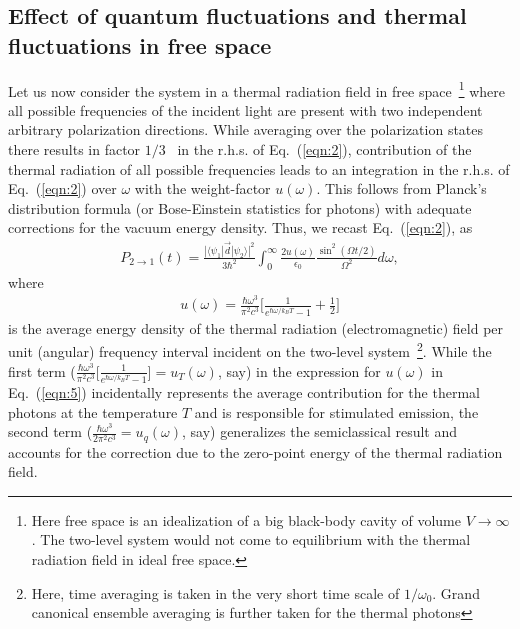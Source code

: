 \documentclass[aps,pra,twocolumn,showpacs,preprintnumbers,amsmath,amssymb,footinbib]{revtex4}
\begin{document}
\subsection{Effect of quantum fluctuations and thermal fluctuations in free space}
Let us now consider the system in a thermal radiation field in free space~\footnote{Here free space is an idealization of a big black-body cavity of volume $V\rightarrow\infty$. The two-level system would not come to equilibrium with the thermal radiation field in ideal free space.} where all possible frequencies of the incident light are present with two independent arbitrary polarization directions. While averaging over the polarization states there results in factor $1/3$~\cite{Griffiths} in the r.h.s. of Eq.~(\ref{eqn:2}), contribution of the thermal radiation of all possible frequencies leads to an integration in the r.h.s. of Eq.~(\ref{eqn:2}) over $\omega$ with the weight-factor $u(\omega)$. This follows from Planck's distribution formula (or Bose-Einstein statistics for photons) with adequate corrections for the vacuum energy density. Thus, we recast Eq.~(\ref{eqn:2}), as
\begin{eqnarray}\label{eqn:4}
P_{2\rightarrow1}(t)=\frac{|\langle\psi_1|\vec{d}|\psi_2\rangle|^2}{3\hbar^2}\int_0^\infty\frac{2u(\omega)}{\epsilon_0}\frac{\sin^2(\Omega t/2)}{\Omega^2}d\omega,
\end{eqnarray}
where~\cite{Einstein2,Griffiths}
\begin{eqnarray}\label{eqn:5}
u(\omega)=\frac{\hbar\omega^3}{\pi^2c^3}\bigg[\frac{1}{e^{\hbar\omega/k_BT}-1}+\frac{1}{2}\bigg]
\end{eqnarray}
is the average energy density of the thermal radiation (electromagnetic) field per unit (angular) frequency interval incident on the two-level system~\footnote{Here, time averaging is taken in the very short time scale of $1/\omega_0$. Grand canonical ensemble averaging is further taken for the thermal photons}. While the first term ($\frac{\hbar\omega^3}{\pi^2c^3}\big[\frac{1}{e^{\hbar\omega/k_BT}-1}\big]=u_T(\omega)$, say) in the expression for $u(\omega)$ in Eq.~(\ref{eqn:5}) incidentally represents the average contribution for the thermal photons at the temperature $T$ and is responsible for stimulated emission, the second term ($\frac{\hbar\omega^3}{2\pi^2c^3}=u_q(\omega)$, say) generalizes the semiclassical result and accounts for the correction due to the zero-point energy of the thermal radiation field.
\end{document}
